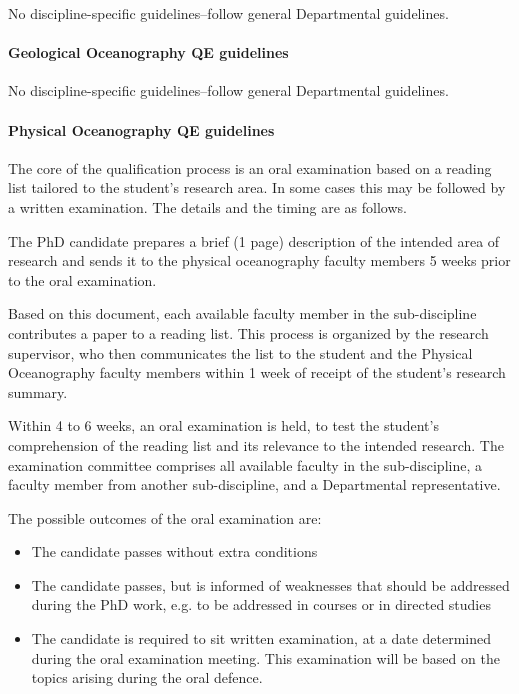 \cp

\p No discipline-specific guidelines--follow general Departmental guidelines.

\paragraph{Geological Oceanography QE guidelines}\hfill

\cp

\p No discipline-specific guidelines--follow general Departmental guidelines.

\paragraph{Physical Oceanography QE guidelines}\hfill
\cp

\p The core of the qualification process is an oral examination based on a reading
list tailored to the student's research area. In some cases this may be
followed by a written examination. The details and the timing are as follows.

\p The PhD candidate prepares a brief (1 page) description of the intended area of
research and sends it to the physical oceanography faculty members 5 weeks
prior to the oral examination.

\p Based on this document, each available faculty member in the sub-discipline
contributes a paper to a reading list. This process is organized by the
research supervisor, who then communicates the list to the student and the
Physical Oceanography faculty members within 1 week of receipt of the student's
research summary.

\p Within 4 to 6 weeks, an oral examination is held, to test the student's
comprehension of the reading list and its relevance to the intended research.
The examination committee comprises all available faculty in the
sub-discipline, a faculty member from another sub-discipline, and a
Departmental representative.

\p The possible outcomes of the oral examination are:
\begin{itemize}
\item The candidate passes without extra conditions

\item The candidate passes, but is informed of weaknesses that should be
addressed during the PhD work, e.g. to be addressed in courses or in directed
studies

\item The candidate is required to sit written examination, at a date
determined during the oral examination meeting. This examination will be based
on the topics arising during the oral defence.

\end{itemize}



